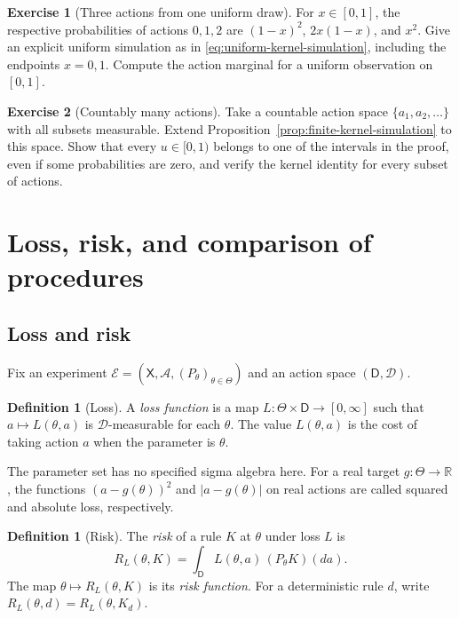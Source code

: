 \documentclass[11pt,oneside]{book}
\theoremstyle{definition}
\newtheorem{definition}[theorem]{Definition}
\newtheorem{exercise}{Exercise}[section]
\theoremstyle{remark}
\newcommand{\R}{\mathbb R}
\begin{document}
\begin{exercise}[Three actions from one uniform draw]
\label{exer:three-action-simulation}
For $x\in[0,1]$, the respective probabilities of actions $0,1,2$ are
$(1-x)^2$, $2x(1-x)$, and $x^2$. Give an explicit uniform simulation as
in \eqref{eq:uniform-kernel-simulation}, including the endpoints $x=0,1$.
Compute the action marginal for a uniform observation on $[0,1]$.
\end{exercise}

\begin{exercise}[Countably many actions]
\label{exer:countable-action-simulation}
Take a countable action space $\{a_1,a_2,\ldots\}$ with all subsets
measurable. Extend Proposition~\ref{prop:finite-kernel-simulation} to this space. Show that every $u\in[0,1)$
belongs to one of the intervals in the proof, even if some probabilities
are zero, and verify the kernel identity for every subset of actions.
\end{exercise}

\clearpage
\section{Loss, risk, and comparison of procedures}
\label{sec:loss-risk}

\subsection{Loss and risk}
\label{subsec:loss-risk-definitions}

Fix an experiment $\mathcal E=(\mathsf X,\mathcal A,(P_\theta)_{\theta\in\Theta})$
and an action space $(\mathsf D,\mathcal D)$.

\begin{definition}[Loss]
\label{def:decision-loss}
A \emph{loss function} is a map $L:\Theta\times\mathsf D\to[0,\infty]$
such that $a\mapsto L(\theta,a)$ is $\mathcal D$-measurable for each
$\theta$. The value $L(\theta,a)$ is the cost of taking action $a$
when the parameter is $\theta$.
\end{definition}

The parameter set has no specified sigma algebra here. For a real target
$g:\Theta\to\R$, the functions $(a-g(\theta))^2$ and $|a-g(\theta)|$ on
real actions are called squared and absolute loss, respectively.

\begin{definition}[Risk]
\label{def:decision-risk}
The \emph{risk} of a rule $K$ at $\theta$ under loss $L$ is
\begin{equation}
R_L(\theta,K)=\int_{\mathsf D} L(\theta,a)\,(P_\theta K)(da).
\label{eq:risk-action-law}
\end{equation}
The map $\theta\mapsto R_L(\theta,K)$ is its \emph{risk function}.
For a deterministic rule $d$, write $R_L(\theta,d)=R_L(\theta,K_d)$.
\end{definition}
\end{document}
